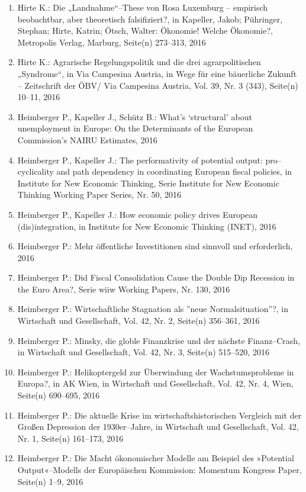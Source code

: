 \begin{enumerate}
	 \item Hirte K.: Die „Landnahme“--These von Rosa Luxemburg – empirisch beobachtbar, aber theoretisch falsifiziert?, in Kapeller, Jakob; Pühringer, Stephan; Hirte, Katrin; Ötsch, Walter: Ökonomie! Welche Ökonomie?, Metropolis Verlag, Marburg, Seite(n) 273--313, 2016
	 \item Hirte K.: Agrarische Regelungspolitik und die drei agrarpolitischen „Syndrome“, in Via Campesina Austria, in Wege für eine bäuerliche Zukunft – Zeitschrift der ÖBV/ Via Campesina Austria, Vol. 39, Nr. 3 (343), Seite(n) 10--11, 2016
	 \item Heimberger P., Kapeller J., Schütz B.: What’s ‘structural’ about unemployment in Europe: On the Determinants of the European Commission’s NAIRU Estimates, 2016
	 \item Heimberger P., Kapeller J.: The performativity of potential output: pro--cyclicality and path dependency in coordinating European fiscal policies, in Institute for New Economic Thinking, Serie Institute for New Economic Thinking  Working Paper Series, Nr. 50, 2016
	 \item Heimberger P., Kapeller J.: How economic policy drives European (dis)integration, in Institute for New Economic Thinking (INET), 2016
	 \item Heimberger P.: Mehr öffentliche Investitionen sind sinnvoll und erforderlich, 2016
	 \item Heimberger P.: Did Fiscal Consolidation Cause the Double Dip Recession in the Euro Area?, Serie wiiw Working Papers, Nr. 130, 2016
	 \item Heimberger P.: Wirtschaftliche Stagnation als ''neue Normalsituation''?, in Wirtschaft und Gesellschaft, Vol. 42, Nr. 2, Seite(n) 356--361, 2016
	 \item Heimberger P.: Minsky, die globle Finanzkrise und der nächste Finanz--Crash, in Wirtschaft und Gesellschaft, Vol. 42, Nr. 3, Seite(n) 515--520, 2016
	 \item Heimberger P.: Helikoptergeld zur Überwindung der Wachstumsprobleme in Europa?, in AK Wien, in Wirtschaft und Gesellschaft, Vol. 42, Nr. 4, Wien, Seite(n) 690--695, 2016
	 \item Heimberger P.: Die aktuelle Krise im wirtschaftshistorischen Vergleich mit der Großen Depression der 1930er--Jahre, in Wirtschaft und Gesellschaft, Vol. 42, Nr. 1, Seite(n) 161--173, 2016
	 \item Heimberger P.: Die Macht ökonomischer Modelle am Beispiel des »Potential Output«--Modells der Europäischen Kommission: Momentum Kongress Paper, Seite(n) 1--9, 2016

\end{enumerate}
